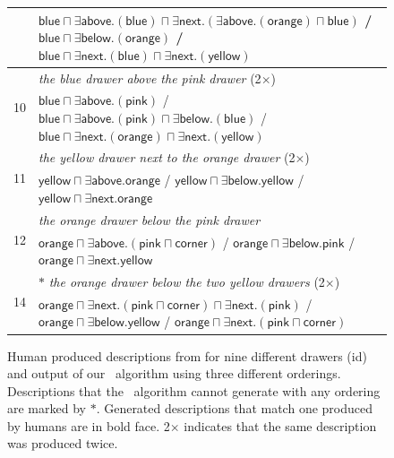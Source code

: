 \begin{figure}[thb]
\begin{footnotesize}
\begin{tabular}{|l|p{}|}
& $\mathsf{blue} \sqcap \exists \mathsf{above}.(\mathsf{blue}) \sqcap \exists \mathsf{next}.(\exists \mathsf{above}.(\mathsf{orange}) \sqcap \mathsf{blue})$ / $\bm{\mathsf{blue} \sqcap \exists \mathsf{below}.(\mathsf{orange})}$ \textbf{/} $\mathsf{blue} \sqcap \exists \mathsf{next}.(\mathsf{blue}) \sqcap \exists \mathsf{next}.(\mathsf{yellow})$\\\hline
\multirow{2}{*}{10} & \textit{the blue drawer above the pink drawer} (2$\times$)\\
&  $\bm{\mathsf{blue} \sqcap \exists \mathsf{above}.(\mathsf{pink})}$  / $\mathsf{blue} \sqcap \exists \mathsf{above}.(\mathsf{pink}) \sqcap \exists \mathsf{below}.(\mathsf{blue})$  / $\mathsf{blue} \sqcap \exists \mathsf{next}.(\mathsf{orange}) \sqcap \exists \mathsf{next}.(\mathsf{yellow})$\\\hline
\multirow{2}{*}{11} & \textit{the yellow drawer next to the orange drawer} (2$\times$)\\
&  $\mathsf{yellow} \sqcap \exists \mathsf{above}.\mathsf{orange}$  / $\mathsf{yellow} \sqcap \exists \mathsf{below}.\mathsf{yellow}$  / $\bm{\mathsf{yellow} \sqcap \exists \mathsf{next}.\mathsf{orange}}$\\\hline
\multirow{2}{*}{12} & \textit{the orange drawer below the pink drawer}\\ 
&  $\mathsf{orange} \sqcap \exists \mathsf{above}.(\mathsf{pink} \sqcap \mathsf{corner})$  / $\bm{\mathsf{orange} \sqcap \exists \mathsf{below}.\mathsf{pink}}$  / $\mathsf{orange} \sqcap \exists \mathsf{next}.\mathsf{yellow}$\\\hline
\multirow{2}{*}{14} & $\ast$ \textit{the orange drawer below the two yellow drawers} (2$\times$)\\
&  $ \mathsf{orange} \sqcap \exists \mathsf{next}.(\mathsf{pink} \sqcap \mathsf{corner}) \sqcap \exists \mathsf{next}.(\mathsf{pink})$  / $\mathsf{orange} \sqcap \exists \mathsf{below}.\mathsf{yellow}$  / $\mathsf{orange} \sqcap \exists \mathsf{next}.(\mathsf{pink} \sqcap \mathsf{corner})$\\\hline
\end{tabular}
\end{footnotesize}

\caption{Human produced descriptions from
\cite{viethen06:_algor_for_gener_refer_expres} for nine different drawers (id)
 and output of our \el\ algorithm using three different orderings.
 Descriptions that the \el\ algorithm cannot generate with any
 ordering are marked by $\ast$. Generated descriptions that match one
 produced by humans are in bold face. 2$\times$ indicates that the
 same description was produced twice.}

\label{fig:example_outputs}
\end{figure}

